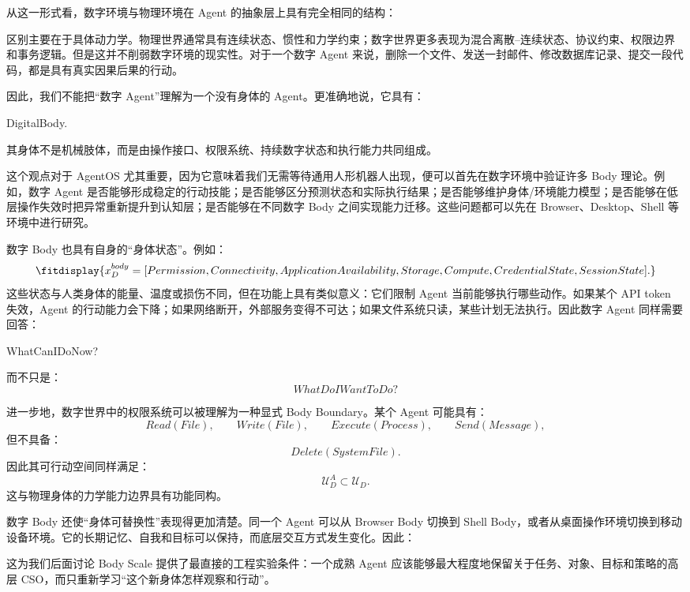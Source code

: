 从这一形式看，数字环境与物理环境在 Agent 的抽象层上具有完全相同的结构：
\begin{statementbox}
\centering
{}
\end{statementbox}
区别主要在于具体动力学。物理世界通常具有连续状态、惯性和力学约束；数字世界更多表现为混合离散--连续状态、协议约束、权限边界和事务逻辑。但是这并不削弱数字环境的现实性。对于一个数字 Agent 来说，删除一个文件、发送一封邮件、修改数据库记录、提交一段代码，都是具有真实因果后果的行动。

因此，我们不能把“数字 Agent”理解为一个没有身体的 Agent。更准确地说，它具有：
\begin{statementbox}
DigitalBody.
\end{statementbox}
其身体不是机械肢体，而是由操作接口、权限系统、持续数字状态和执行能力共同组成。

这个观点对于 AgentOS 尤其重要，因为它意味着我们无需等待通用人形机器人出现，便可以首先在数字环境中验证许多 Body 理论。例如，数字 Agent 是否能够形成稳定的行动技能；是否能够区分预测状态和实际执行结果；是否能够维护身体/环境能力模型；是否能够在低层操作失效时把异常重新提升到认知层；是否能够在不同数字 Body 之间实现能力迁移。这些问题都可以先在 Browser、Desktop、Shell 等环境中进行研究。

数字 Body 也具有自身的“身体状态”。例如：
\[
\fitdisplay{
x_D^{body}
=
[
Permission,
Connectivity,
ApplicationAvailability,
Storage,
Compute,
CredentialState,
SessionState
].
}
\]
这些状态与人类身体的能量、温度或损伤不同，但在功能上具有类似意义：它们限制 Agent 当前能够执行哪些动作。如果某个 API token 失效，Agent 的行动能力会下降；如果网络断开，外部服务变得不可达；如果文件系统只读，某些计划无法执行。因此数字 Agent 同样需要回答：
\begin{statementbox}
WhatCanIDoNow?
\end{statementbox}
而不只是：
\[
WhatDoIWantToDo?
\]

进一步地，数字世界中的权限系统可以被理解为一种显式 Body Boundary。某个 Agent 可能具有：
\[
Read(File),
\qquad
Write(File),
\qquad
Execute(Process),
\qquad
Send(Message),
\]
但不具备：
\[
Delete(SystemFile).
\]
因此其可行动空间同样满足：
\[
\mathcal U_D^{A}
\subset
\mathcal U_D.
\]
这与物理身体的力学能力边界具有功能同构。

数字 Body 还使“身体可替换性”表现得更加清楚。同一个 Agent 可以从 Browser Body 切换到 Shell Body，或者从桌面操作环境切换到移动设备环境。它的长期记忆、自我和目标可以保持，而底层交互方式发生变化。因此：
\begin{statementbox}
\centering
{}
\end{statementbox}
这为我们后面讨论 Body Scale 提供了最直接的工程实验条件：一个成熟 Agent 应该能够最大程度地保留关于任务、对象、目标和策略的高层 CSO，而只重新学习“这个新身体怎样观察和行动”。

